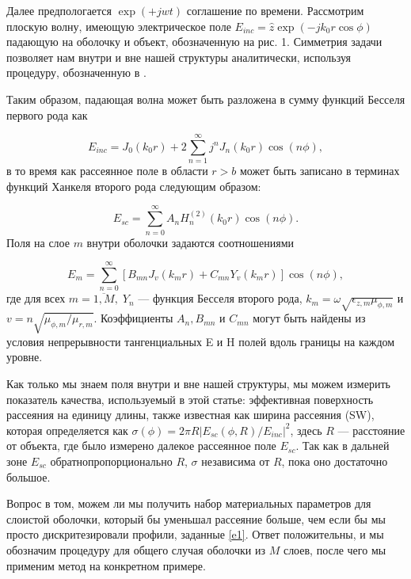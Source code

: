 \documentclass[a4paper, 12pt]{article}
\begin{document}
Далее предпологается $\exp(+jwt)$ соглашение по времени. Рассмотрим плоскую волну,
имеющую электрическое поле $E_{inc} = \hat{z}\exp(-jk_0r\cos\phi)$ падающую
на оболочку и объект, обозначенную на рис. 1. Симметрия задачи позволяет нам
внутри и вне нашей структуры аналитически, используя процедуру, обозначенную в
\cite{11}.

Таким образом, падающая волна может быть разложена в сумму функций Бесселя
первого рода как 

\begin{equation}
	E_{inc} = J_0(k_0r) + 2\sum\limits_{n=1}^\infty j^nJ_n(k_0r)\cos(n\phi),
\end{equation}
в то время как рассеянное поле в области $r > b$ может быть записано в терминах
функций Ханкеля второго рода следующим образом:

\begin{equation}
	E_{sc} = \sum\limits_{n=0}^\infty A_nH_n^{(2)}(k_0r)\cos(n\phi).
\end{equation}
Поля на слое $m$ внутри оболочки задаются соотношениями

\begin{equation}\label{e3}
	E_m = \sum\limits_{n=0}^\infty[B_{mn}J_v(k_mr) + C_{mn}Y_v(k_mr)]\cos(n\phi),
\end{equation}
где для всех $m=\overline{1,M},\; Y_n$ --- функция Бесселя второго рода,
$k_m=\omega\sqrt{\epsilon_{z,m}\mu_{\phi,m}}$ и $v=n\sqrt{\mu_{\phi,m}/\mu_{r,m}}$.
Коэффициенты $A_n, B_{mn}$ и $C_{mn}$ могут быть найдены из условия непрерывности
тангенциальных E и H полей вдоль границы на каждом уровне.

Как только мы знаем поля внутри и вне нашей структуры, мы можем измерить 
показатель качества, используемый в этой статье: эффективная поверхность
рассеяния на единицу длины, также известная как ширина рассеяния (SW),
которая определяется как $\sigma(\phi)=2\pi R|E_{sc}(\phi,R)/E_{inc}|^2$, здесь
$R$ --- расстояние от объекта, где было измерено далекое рассеянное поле $E_{sc}$.
Так как в дальней зоне $E_{sc}$ обратнопропорционально $R$, $\sigma$ независима
от $R$, пока оно достаточно большое.

Вопрос в том, можем ли мы получить набор материальных параметров для слоистой
оболочки, который бы уменьшал рассеяние больше, чем если бы мы просто
дискритезировали профили, заданные \eqref{e1}. Ответ положительны, и мы обозначим
процедуру для общего случая оболочки из $M$ слоев, после чего мы применим
метод на конкретном примере.
\end{document}

